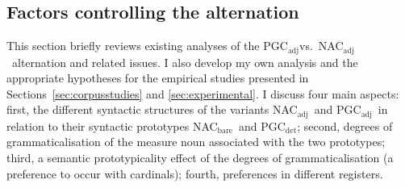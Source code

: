 \documentclass[USenglish]{article}
\newcommand{\Sub}[1]{\ensuremath{\mathrm{_{#1}}}}
\newcommand{\NACb}{NAC\Sub{bare}}
\newcommand{\NACa}{NAC\Sub{adj}}
\newcommand{\PGCd}{PGC\Sub{det}}
\newcommand{\PGCa}{PGC\Sub{adj}}
\begin{document}
\subsection{Factors controlling the alternation}
\label{sec:analyses}

This section briefly reviews existing analyses of the \PGCa vs.\ \NACa\ alternation and related issues.
I also develop my own analysis and the appropriate hypotheses for the empirical studies presented in Sections~\ref{sec:corpusstudies} and \ref{sec:experimental}.
I discuss four main aspects:
first, the different syntactic structures of the variants \NACa\ and \PGCa\ in relation to their syntactic prototypes \NACb\ and \PGCd;
second, degrees of grammaticalisation of the measure noun associated with the two prototypes;
third, a semantic prototypicality effect of the degrees of grammaticalisation (a preference to occur with cardinals);
fourth, preferences in different registers.

\end{document}
